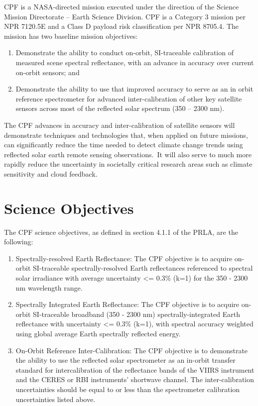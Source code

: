 \documentclass[12pt,oneside,oldfontcommands]{memoir}
\begin{document}
\gls{CPF} is a NASA-directed mission executed under the direction of the Science Mission Directorate – Earth Science Division. \gls{CPF} is a Category 3 mission per NPR 7120.5E and a Class D payload risk classification per NPR 8705.4. The mission has two baseline mission objectives:

\begin{enumerate}
\item{} Demonstrate the ability to conduct on-orbit, \gls{SI}-traceable calibration of \gls{measure}d scene spectral reflectance, with an advance in accuracy over current on-orbit sensors; and

\item{} Demonstrate the ability to use that improved accuracy to serve as an in orbit reference spectrometer for advanced inter-calibration of other key satellite sensors across most of the reflected solar spectrum (350 – 2300 nm).

\end{enumerate}

The \gls{CPF} advances in accuracy and inter-calibration of satellite sensors will demonstrate techniques and technologies that, when applied on future missions, can significantly reduce the time needed to detect climate change trends using reflected solar earth remote sensing observations. It will also serve to much more rapidly reduce the uncertainty in societally critical research areas such as climate sensitivity and cloud feedback.

\section{Science Objectives }
\label{scienceobjectives}

The \gls{CPF} science objectives, as defined in section 4.1.1 of the PRLA, are the following:

\begin{enumerate}
\item{} Spectrally-resolved Earth Reflectance: The \gls{CPF} objective is to acquire on-orbit \gls{SI}-traceable spectrally-resolved Earth reflectances referenced to spectral solar irradiance with average uncertainty <= 0.3\% (k=1) for the 350 - 2300 nm wavelength range.

\item{} Spectrally Integrated Earth Reflectance: The \gls{CPF} objective is to acquire on-orbit \gls{SI}-traceable broadband (350 - 2300 nm) spectrally-integrated Earth reflectance with uncertainty <= 0.3\% (k=1), with spectral accuracy weighted using global average Earth spectrally reflected energy.

\item{} On-Orbit Reference Inter-Calibration: The \gls{CPF} objective is to demonstrate the ability to use the reflected solar spectrometer as an in-orbit transfer standard for intercalibration of the reflectance bands of the \gls{VIIRS} instrument and the \gls{CERES} or \gls{RBI} instruments' shortwave channel. The inter-calibration uncertainties should be equal to or less than the spectrometer calibration uncertainties listed above.

\end{enumerate}
\end{document}
